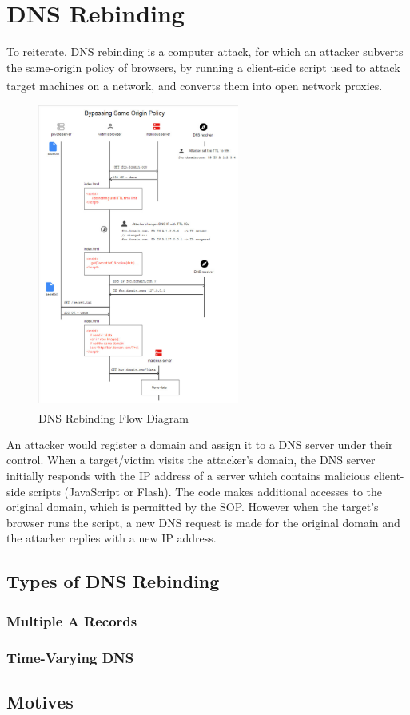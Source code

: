 \chapter{DNS Rebinding}

To reiterate, DNS rebinding is a computer attack, for which an attacker subverts
the same-origin policy of browsers, by running a client-side script used to
attack target machines on a network, and converts them into open network
proxies\textsuperscript{\cite{jackson2009protecting}}.

\vspace{0.5cm}

\begin{figure}[H]
\begin{center}
	\includegraphics[width=0.59\textwidth,keepaspectratio]{img/dnsrebindingflow.jpg}
	\caption{DNS Rebinding Flow Diagram\textsuperscript{\cite{vulnsec}}}
\end{center}
\end{figure}

\vspace{0.5cm}

An attacker would register a domain and assign it to a DNS server under their
control. When a target/victim visits the attacker's domain, the DNS server
initially responds with the IP address of a server which contains malicious
client-side scripts (JavaScript or Flash). The code makes additional accesses
to the original domain, which is permitted by the SOP. However when the
target's browser runs the script, a new DNS request is made for the original
domain and the attacker replies with a new IP address.

\section{Types of DNS Rebinding}

\subsection{Multiple A Records}

\subsection{Time-Varying DNS}

\section{Motives}
